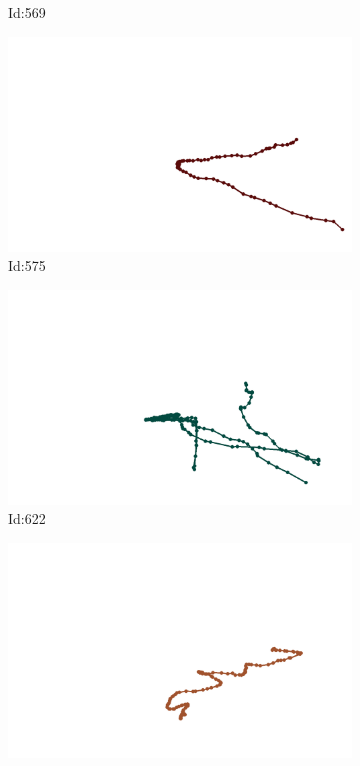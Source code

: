 \documentclass[12pt,twoside]{report}
\begin{document}
\begin{figure}
\begin{subfigure}[b]{0.20\textwidth}
\caption{Id:569}
\end{subfigure}
\begin{subfigure}[b]{0.20\textwidth}
\centering
\includegraphics[width=\textwidth]{../trajectories/575.png}
\caption{Id:575}
\end{subfigure}
\begin{subfigure}[b]{0.20\textwidth}
\centering
\includegraphics[width=\textwidth]{../trajectories/622.png}
\caption{Id:622}
\end{subfigure}
\begin{subfigure}[b]{0.20\textwidth}
\centering
\includegraphics[width=\textwidth]{../trajectories/691.png}

\end{subfigure}
\end{figure}
\end{document}
